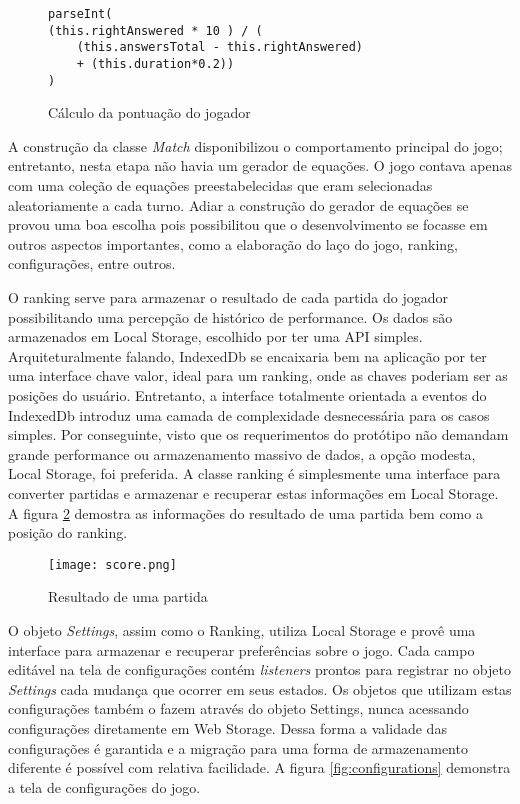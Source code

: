 \begin{figure}[H]
\centering
\begin{verbatim}
parseInt(
(this.rightAnswered * 10 ) / (
    (this.answersTotal - this.rightAnswered) 
    + (this.duration*0.2))
)
\end{verbatim}
\caption{Cálculo da pontuação do jogador}
\label{fig:punctuationCalculation}
\end{figure}

A construção da classe \textit{Match} disponibilizou o comportamento
principal do jogo; entretanto, nesta etapa não havia um gerador de
equações. O jogo contava apenas com uma coleção de equações
preestabelecidas que eram selecionadas aleatoriamente a cada turno.
Adiar a construção do gerador de equações se provou uma boa
escolha pois possibilitou que o desenvolvimento se focasse em outros
aspectos importantes, como a elaboração do laço do jogo, ranking,
configurações, entre outros.

O ranking serve para armazenar o resultado de cada partida do jogador
possibilitando uma percepção de histórico de performance. Os
dados são armazenados em Local Storage, escolhido por ter uma API
simples. Arquiteturalmente falando, IndexedDb se encaixaria bem na
aplicação por ter uma interface chave valor, ideal para um ranking,
onde as chaves poderiam ser as posições do usuário. Entretanto, a
interface totalmente orientada a eventos do IndexedDb introduz uma
camada de complexidade desnecessária para os casos simples. Por
conseguinte, visto que os requerimentos do protótipo não demandam
grande performance ou armazenamento massivo de dados, a opção
modesta, Local Storage, foi preferida. A classe ranking é simplesmente
uma interface para converter partidas e armazenar e recuperar estas
informações em Local Storage. A figura \ref{fig:placar} demostra
as informações do resultado de uma partida bem como a posição do
ranking.

\begin{figure}[H]
    \centering
    \texttt{[image: score.png]}
	\caption{Resultado de uma partida}
    \label{fig:placar}
\end{figure}

O objeto \textit{Settings}, assim como o Ranking, utiliza Local Storage
e provê uma interface para armazenar e recuperar preferências sobre
o jogo. Cada campo editável na tela de configurações contém
\textit{listeners} prontos para registrar no objeto \textit{Settings}
cada mudança que ocorrer em seus estados. Os objetos que utilizam estas
configurações também o fazem através do objeto Settings, nunca
acessando configurações diretamente em Web Storage. Dessa forma a
validade das configurações é garantida e a migração para uma forma
de armazenamento diferente é possível com relativa facilidade.
A figura \ref{fig:configurations} demonstra a tela de configurações do 
jogo.

